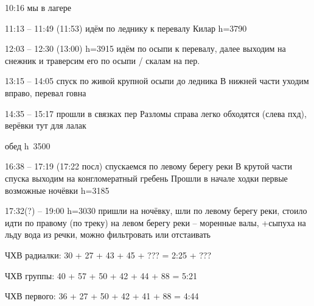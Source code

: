 10:16 мы в лагере

11:13 -- 11:49 (11:53) идём по леднику к перевалу Килар h=3790

12:03 -- 12:30 (13:00) h=3915 идём по осыпи к перевалу, далее выходим на снежник и траверсим его по
осыпи / скалам на пер.

13:15 -- 14:05 спуск по живой крупной осыпи до ледника
В нижней части уходим вправо, перевал говна

14:35 -- 15:17 прошли в связках пер
Разломы справа легко обходятся (слева пхд), верёвки тут для лалак

обед h~3500

16:38 -- 17:19 (17:22 посл)
спускаемся по левому берегу реки
В крутой части спуска выходим на конгломератный гребень
Прошли в начале ходки первые возможные ночёвки
h=3185

17:32(?) -- 19:00 h=3030 пришли на ночёвку, шли по левому берегу реки, стоило идти по правому (по треку)
на левом берегу реки -- моренные валы, +сыпуха на льду вода из речки, можно фильтровать или отстаивать


ЧХВ радиалки: 30 + 27 + 43 + 45 + ??? = 2:25 + ???

ЧХВ группы: 40 + 57 + 50 + 42 + 44 + 88 = 5:21

ЧХВ первого: 36 + 27 + 50 + 42 + 41 + 88 = 4:44

    \FloatBarrier
